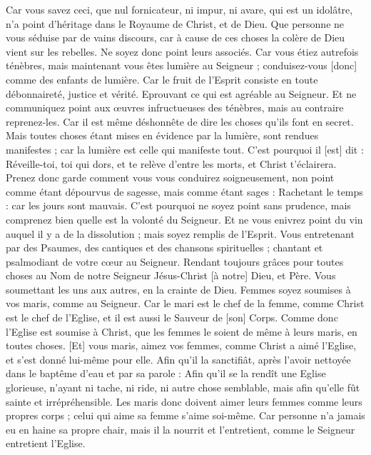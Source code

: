 \begin{multicols}{2}
Car vous savez ceci, que nul fornicateur, ni impur, ni avare, qui est un idolâtre, n'a point d'héritage dans le Royaume de Christ, et de Dieu.
Que personne ne vous séduise par de vains discours, car à cause de ces choses la colère de Dieu vient sur les rebelles.
Ne soyez donc point leurs associés.
Car vous étiez autrefois ténèbres, mais maintenant vous êtes lumière au Seigneur ; conduisez-vous [donc] comme des enfants de lumière.
Car le fruit de l'Esprit consiste en toute débonnaireté, justice et vérité.
Eprouvant ce qui est agréable au Seigneur.
Et ne communiquez point aux œuvres infructueuses des ténèbres, mais au contraire reprenez-les.
Car il est même déshonnête de dire les choses qu'ils font en secret.
Mais toutes choses étant mises en évidence par la lumière, sont rendues manifestes ; car la lumière est celle qui manifeste tout.
C'est pourquoi il [est] dit : Réveille-toi, toi qui dors, et te relève d'entre les morts, et Christ t'éclairera.
Prenez donc garde comment vous vous conduirez soigneusement, non point comme étant dépourvus de sagesse, mais comme étant sages :
Rachetant le temps : car les jours sont mauvais.
C'est pourquoi ne soyez point sans prudence, mais comprenez bien quelle est la volonté du Seigneur.
Et ne vous enivrez point du vin auquel il y a de la dissolution ; mais soyez remplis de l'Esprit.
Vous entretenant par des Psaumes, des cantiques et des chansons spirituelles ; chantant et psalmodiant de votre cœur au Seigneur.
Rendant toujours grâces pour toutes choses au Nom de notre Seigneur Jésus-Christ [à notre] Dieu, et Père.
Vous soumettant les uns aux autres, en la crainte de Dieu.
Femmes soyez soumises à vos maris, comme au Seigneur.
Car le mari est le chef de la femme, comme Christ est le chef de l'Eglise, et il est aussi le Sauveur de [son] Corps.
Comme donc l'Eglise est soumise à Christ, que les femmes le soient de même à leurs maris, en toutes choses.
[Et] vous maris, aimez vos femmes, comme Christ a aimé l'Eglise, et s'est donné lui-même pour elle.
Afin qu'il la sanctifiât, après l’avoir nettoyée dans le baptême d'eau et par sa parole :
Afin qu'il se la rendît une Eglise glorieuse, n'ayant ni tache, ni ride, ni autre chose semblable, mais afin qu'elle fût sainte et irrépréhensible.
Les maris donc doivent aimer leurs femmes comme leurs propres corps ; celui qui aime sa femme s'aime soi-même.
Car personne n'a jamais eu en haine sa propre chair, mais il la nourrit et l'entretient, comme le Seigneur entretient l'Eglise.

\end{multicols}
